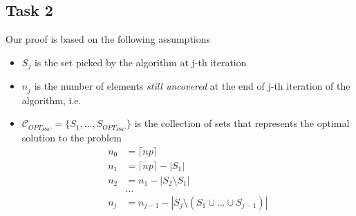 \documentclass[a4paper,11pt]{article}
\begin{document}
\subsection{Task 2}
Our proof is based on the following assumptions
\begin{itemize}
	\item $S_{j}$ is the set picked by the algorithm at j-th iteration
	
	\item $n_j$ is the number of elements \textit{still uncovered} at the end of j-th iteration of the algorithm, i.e.
	
	\item $\mathcal{C}_{OPT_{PSC}} = \{ S_{1},\ldots, S_{OPT_{PSC}}\} $ is the collection of sets that represents the optimal solution to the problem
	\begin{align}
	n_0 &= \lceil np \rceil\nonumber\\
	n_1 &= \lceil np \rceil - \left|S_1\right|\nonumber\\
	n_2 &= n_1 - \left|S_2  \setminus S_1\right|\nonumber\\
	&\dots\nonumber\\
	n_j &= n_{j-1} - \left|S_j \setminus (S_1 \cup \dots \cup S_{j-1})\right| \label{2.0} 
	\end{align}
	
\end{itemize}
\end{document}
